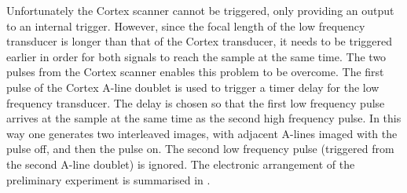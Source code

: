 Unfortunately the Cortex scanner cannot be triggered,
only providing an output to an internal trigger.
However, since the focal length of the low frequency transducer is longer than that
of the Cortex transducer,
it needs to be triggered earlier in order for
both signals to reach the sample at the same time.
%
The two pulses from the Cortex scanner enables this problem to be overcome.
The first pulse of the Cortex A-line doublet is used to trigger 
a timer delay for the low frequency transducer.
The delay is chosen  so that the first low frequency pulse arrives at the
sample at the same time as the second high frequency pulse.
In this way one  generates two interleaved images, with adjacent A-lines
imaged with the pulse off, and then the pulse on.
The second low frequency pulse  (triggered from the second
A-line doublet) is ignored.
The electronic arrangement of the preliminary experiment is summarised in \figref{}.






